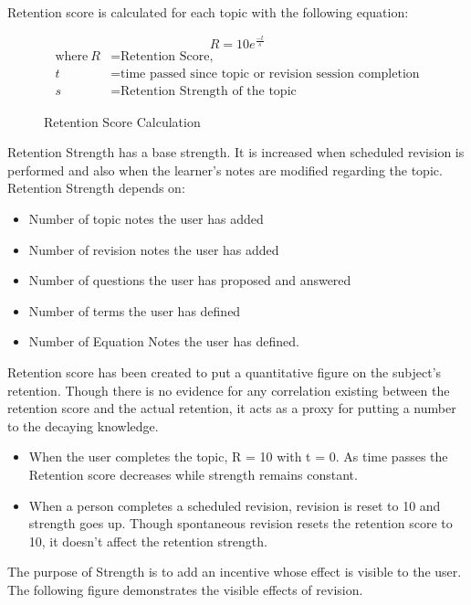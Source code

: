 \documentclass[]{article}
\begin{document}
Retention score is calculated for each topic with the following equation:

\begin{figure}[!ht]
  \begin{equation}
    R = 10e^{\frac{-t}{s}}
  \end{equation}
\begin{align*}
  \text{where}~R &= \text{Retention Score,} \\
  t &= \text{time passed since topic or revision session completion} \\
  s &= \text{Retention Strength of the topic}
\end{align*}
\caption{Retention Score Calculation}
\label{eq:2}
\end{figure}


Retention Strength has a base strength. It is increased when scheduled revision is performed and also when the learner's notes are modified regarding the topic.
Retention Strength depends on:
\begin{itemize}
  \item Number of topic notes the user has added
  \item Number of revision notes the user has added
  \item Number of questions the user has proposed and answered
  \item Number of terms the user has defined
  \item Number of Equation Notes the user has defined.
\end{itemize}
  
Retention score has been created to put a quantitative figure on the subject's retention. Though there is no evidence for any correlation existing between the retention score and the actual retention, it acts as a proxy for putting a number to the decaying knowledge. 
\begin{itemize}
  \item When the user completes the topic, R = 10 with t = 0. As time passes the Retention score decreases while strength remains constant.
  \item When a person completes a scheduled revision, revision is reset to 10 and strength goes up. Though spontaneous revision resets the retention score to 10, it doesn't affect the retention strength. 
\end{itemize}

The purpose of Strength is to add an incentive whose effect is visible to the user. The following figure demonstrates the visible effects of revision.
\end{document}
